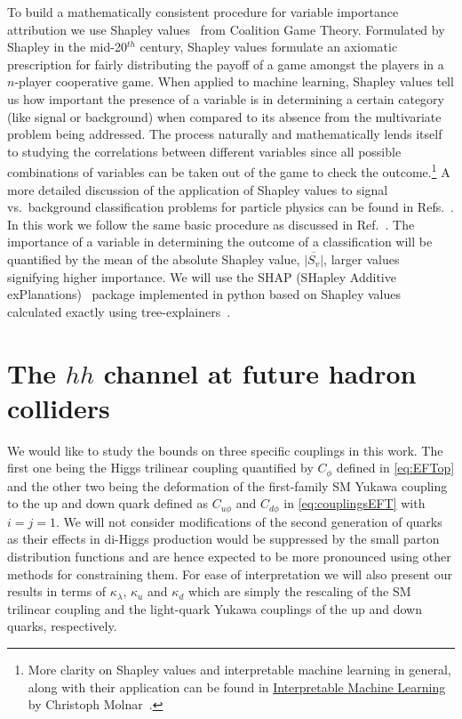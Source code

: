 To build a mathematically consistent procedure for variable importance attribution we use Shapley values~\cite{shapley1951notes} from Coalition Game Theory. Formulated by Shapley in the mid-20$^{th}$ century, Shapley values formulate an axiomatic prescription for fairly distributing the payoff of a game amongst the players in a $n$-player cooperative game. When applied to machine learning, Shapley values tell us how important the presence of a variable is in determining a certain category (like signal or background) when compared to its absence from the multivariate problem being addressed. The process naturally and mathematically lends itself to studying the correlations between different variables since all possible combinations of variables can be taken out of the game to check the outcome.\footnote{More clarity on Shapley values and interpretable machine learning in general, along with their application can be found in \href{https://christophm.github.io/interpretable-ml-book/}{Interpretable Machine Learning } by Christoph Molnar~\cite{molnar2020interpretable}.} A more detailed discussion of the application of Shapley values to signal vs.~background classification problems for particle physics can be found in Refs.~\cite{Grojean:2020ech,Alvestad:2021sje,Cornell:2021gut}. In this work we follow the same basic procedure as discussed in Ref.~\cite{Grojean:2020ech}. The importance of a variable in determining the outcome of a classification will be quantified by the mean of the absolute Shapley value, $\overline{|S_v|}$, larger values signifying higher importance. We will use the SHAP (SHapley Additive exPlanations)~\cite{NIPS2017_7062} package implemented in python based on Shapley values calculated exactly using tree-explainers~\cite{2018arXiv180203888L,Lundberg:2020vt}.


\section{The \texorpdfstring{$hh$}{hh} channel at future hadron colliders}
\label{sec:hadronC}

We would like to study the bounds on three specific couplings in this work. The first one being the Higgs trilinear coupling quantified by $C_\phi$ defined in \autoref{eq:EFTop} and the other two being the deformation of the first-family SM Yukawa coupling to the up and down quark defined as $C_{u\phi}$ and $C_{d\phi}$ in \autoref{eq:couplingsEFT} with $i=j=1$. 
We will not consider modifications of the second generation of quarks as their effects in di-Higgs production would be suppressed by the small parton distribution functions and are hence expected to be more pronounced using other methods for constraining them.
For ease of interpretation we will also present our results in terms of $\kappa_\lambda$, $\kappa_u$ and $\kappa_d$ which are simply the rescaling of the SM trilinear coupling and the light-quark Yukawa couplings of the up and down quarks, respectively. 

